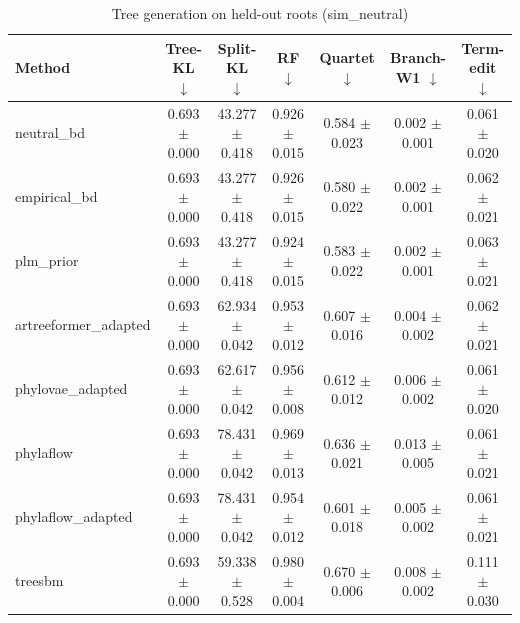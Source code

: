 \begin{table}[t]\centering
\caption{Tree generation on held-out roots (sim_neutral)}
\begin{tabular}{lcccccc}
\toprule
Method & Tree-KL $\downarrow$ & Split-KL $\downarrow$ & RF $\downarrow$ & Quartet $\downarrow$ & Branch-W1 $\downarrow$ & Term-edit $\downarrow$ \\
\midrule
neutral\_bd & 0.693 $\pm$ 0.000 & 43.277 $\pm$ 0.418 & 0.926 $\pm$ 0.015 & 0.584 $\pm$ 0.023 & 0.002 $\pm$ 0.001 & 0.061 $\pm$ 0.020 \\
empirical\_bd & 0.693 $\pm$ 0.000 & 43.277 $\pm$ 0.418 & 0.926 $\pm$ 0.015 & 0.580 $\pm$ 0.022 & 0.002 $\pm$ 0.001 & 0.062 $\pm$ 0.021 \\
plm\_prior & 0.693 $\pm$ 0.000 & 43.277 $\pm$ 0.418 & 0.924 $\pm$ 0.015 & 0.583 $\pm$ 0.022 & 0.002 $\pm$ 0.001 & 0.063 $\pm$ 0.021 \\
artreeformer\_adapted & 0.693 $\pm$ 0.000 & 62.934 $\pm$ 0.042 & 0.953 $\pm$ 0.012 & 0.607 $\pm$ 0.016 & 0.004 $\pm$ 0.002 & 0.062 $\pm$ 0.021 \\
phylovae\_adapted & 0.693 $\pm$ 0.000 & 62.617 $\pm$ 0.042 & 0.956 $\pm$ 0.008 & 0.612 $\pm$ 0.012 & 0.006 $\pm$ 0.002 & 0.061 $\pm$ 0.020 \\
phylaflow & 0.693 $\pm$ 0.000 & 78.431 $\pm$ 0.042 & 0.969 $\pm$ 0.013 & 0.636 $\pm$ 0.021 & 0.013 $\pm$ 0.005 & 0.061 $\pm$ 0.021 \\
phylaflow\_adapted & 0.693 $\pm$ 0.000 & 78.431 $\pm$ 0.042 & 0.954 $\pm$ 0.012 & 0.601 $\pm$ 0.018 & 0.005 $\pm$ 0.002 & 0.061 $\pm$ 0.021 \\
treesbm & 0.693 $\pm$ 0.000 & 59.338 $\pm$ 0.528 & 0.980 $\pm$ 0.004 & 0.670 $\pm$ 0.006 & 0.008 $\pm$ 0.002 & 0.111 $\pm$ 0.030 \\
\bottomrule
\end{tabular}
\end{table}